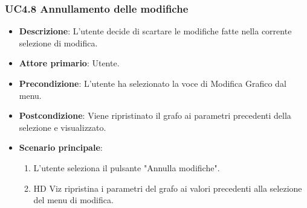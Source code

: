 \subsubsection{UC4.8 Annullamento delle modifiche}
\label{ssub:uc4.8}
\begin{itemize}
    \item \textbf{Descrizione}: L'utente decide di scartare le modifiche fatte nella corrente selezione di modifica.

    \item \textbf{Attore primario}: Utente.
    
    \item \textbf{Precondizione}:   L'utente ha selezionato la voce di Modifica Grafico dal menu.
    \item \textbf{Postcondizione}:  Viene ripristinato il grafo ai parametri precedenti della selezione e visualizzato.

	\item \textbf{Scenario principale}:
        \begin{enumerate}

            \item L'utente seleziona il pulsante "Annulla modifiche".
            \item HD Viz ripristina i parametri del grafo ai valori precedenti alla selezione del menu di modifica.
        
        \end{enumerate}
\end{itemize}



